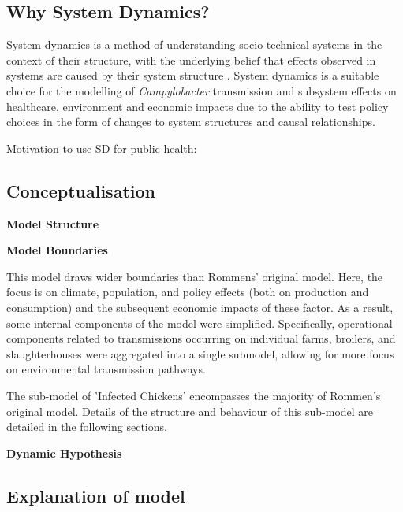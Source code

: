 \subsection{Why System Dynamics?}
System dynamics is a method of understanding socio-technical systems in the context of their structure, with the underlying belief that effects observed in systems are caused by their system structure \parencite{pruyt_triple_2013}. System dynamics is a suitable choice for the modelling of \textit{Campylobacter} transmission and subsystem effects on healthcare, environment and economic impacts due to the ability to test policy choices in the form of changes to system structures and causal relationships.

    
Motivation to use SD for public health: \parencite{homer_system_2006}

    
\subsection{Conceptualisation}

\textbf{Model Structure}



\textbf{Model Boundaries}

This model draws wider boundaries than Rommens' original model. Here, the focus is on climate, population, and policy effects (both on production and consumption) and the subsequent economic impacts of these factor. As a result, some internal components of the model were simplified. Specifically, operational components related to transmissions occurring on individual farms, broilers, and slaughterhouses were aggregated into a single submodel, allowing for more focus on environmental transmission pathways.

The sub-model of 'Infected Chickens' encompasses the majority of Rommen's original model. Details of the structure and behaviour of this sub-model are detailed in the following sections. 

\textbf{Dynamic Hypothesis}



   
\subsection{Explanation of model}
   
